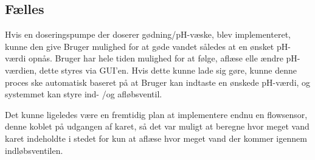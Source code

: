 \subsection{Fælles}
Hvis en doseringspumpe der doserer gødning/pH-væske, blev implementeret, kunne den give Bruger mulighed for at gøde vandet således at en ønsket pH-værdi opnås. Bruger har hele tiden mulighed for at følge, aflæse elle ændre pH-værdien, dette styres via GUI'en. Hvis dette kunne lade sig gøre, kunne denne proces ske automatisk baseret på at Bruger kan indtaste en ønskede pH-værdi, og systemmet kan styre ind- /og afløbsventil.\newline

Det kunne ligeledes være en fremtidig plan at implementere endnu en flowsensor, denne koblet på udgangen af karet, så det var muligt at beregne hvor meget vand karet indeholdte i stedet for kun at aflæse hvor meget vand der kommer igennem indløbsventilen. 